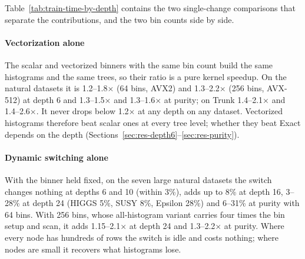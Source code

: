 \documentclass[sigconf]{acmart}%
\begin{document}
Table~\ref{tab:train-time-by-depth} contains the two single-change comparisons that separate the contributions, and the two bin counts side by side.

\paragraph{Vectorization alone} The scalar and vectorized binners with the same bin count build the same histograms and the same trees, so their ratio is a pure kernel speedup. On the natural datasets it is 1.2--1.8$\times$ (64 bins, AVX2) and 1.3--2.2$\times$ (256 bins, AVX-512) at depth 6 and 1.3--1.5$\times$ and 1.3--1.6$\times$ at purity; on Trunk 1.4--2.1$\times$ and 1.4--2.6$\times$. It never drops below 1.2$\times$ at any depth on any dataset. Vectorized histograms therefore beat scalar ones at every tree level; whether they beat Exact depends on the depth (Sections~\ref{sec:res-depth6}--\ref{sec:res-purity}).

\paragraph{Dynamic switching alone} With the binner held fixed, on the seven large natural datasets the switch changes nothing at depths 6 and 10 (within 3\%), adds up to 8\% at depth 16, 3--28\% at depth 24 (HIGGS 5\%, SUSY 8\%, Epsilon 28\%) and 6--31\% at purity with 64 bins. With 256 bins, whose all-histogram variant carries four times the bin setup and scan, it adds 1.15--2.1$\times$ at depth 24 and 1.3--2.2$\times$ at purity. Where every node has hundreds of rows the switch is idle and costs nothing; where nodes are small it recovers what histograms lose.

\end{document}
